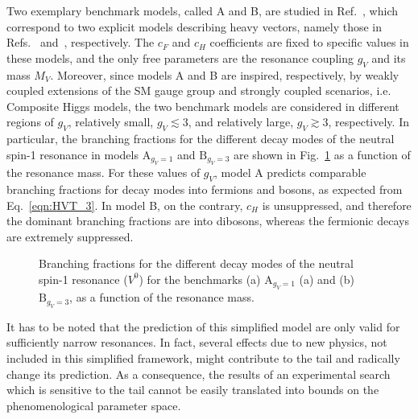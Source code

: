 Two exemplary benchmark models, called A and B, are studied in Ref.~\cite{Pappadopulo:2014qza}, which correspond to two explicit models describing heavy vectors, namely those in Refs.~\cite{PhysRevD.22.727} and~\cite{Composite1}, respectively. The $c_F$ and $c_H$ coefficients are fixed to specific values in these models, and the only free parameters are the resonance coupling $g_V$ and its mass $M_V$.
Moreover, since models A and B are inspired, respectively, by weakly coupled extensions of the SM gauge group and strongly coupled scenarios, i.e. Composite Higgs models, the two benchmark models are considered in different regions of $g_V$, relatively small, $g_V \lesssim 3$, and relatively large, $g_V \gtrsim 3$, respectively. In particular, the branching fractions for the different decay modes of the neutral spin-1 resonance in models $\mathrm{A}_{g_V=1}$ and $\mathrm{B}_{g_V=3}$ are shown in Fig.~\ref{fig:hvtBR} as a function of the resonance mass. For these values of $g_V$, model A predicts comparable branching fractions for decay modes into fermions and bosons, as expected from Eq.~\ref{eqn:HVT_3}. In model B, on the contrary, $c_H$ is unsuppressed, and therefore the dominant branching fractions are into dibosons, whereas the fermionic decays are extremely suppressed.

\begin{figure}[!htb]
\centering
{}
\caption{Branching fractions for the different decay modes of the neutral spin-1 resonance \Zpr ($V^0$) for the benchmarks (a) $\mathrm{A}_{g_V=1}$ (a) and (b) $\mathrm{B}_{g_V=3}$, as a function of the resonance mass.}
\label{fig:hvtBR}
\end{figure}

It has to be noted that the prediction of this simplified model are only valid for sufficiently narrow resonances.
In fact, several effects due to new physics, not included in this simplified framework, might contribute to the tail and radically change its prediction.
As a consequence, the results of an experimental search which is sensitive to the tail cannot be easily translated into bounds on the phenomenological parameter space.